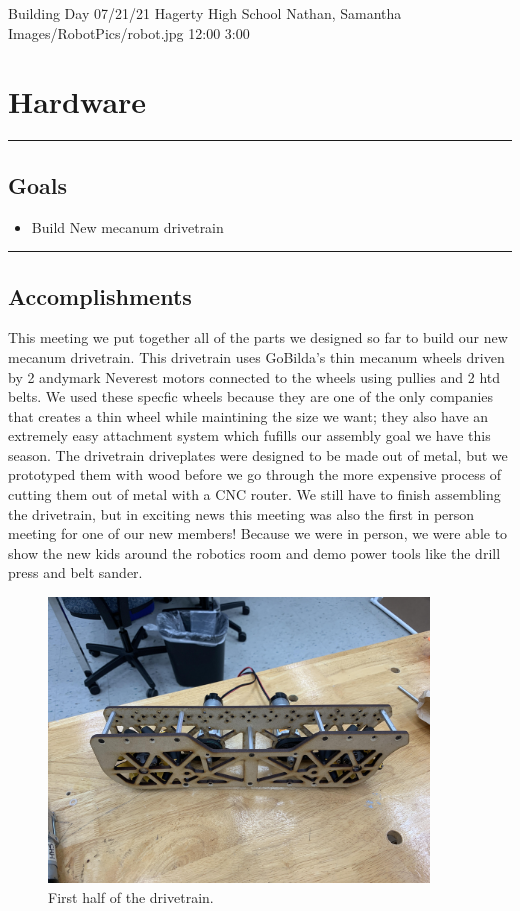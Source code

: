 \insertmeeting 
	{Building Day} 
	{07/21/21}
	{Hagerty High School}
	{Nathan, Samantha}
	{Images/RobotPics/robot.jpg}
	{12:00}
  {3:00}
	
\section*{Hardware}
\noindent\hfil\rule{\textwidth}{.4pt}\hfil
\subsection*{Goals}
\begin{itemize}
    \item Build New mecanum drivetrain   

\end{itemize} 

\noindent\hfil\rule{\textwidth}{.4pt}\hfil

\subsection*{Accomplishments}
This meeting we put together all of the parts we designed so far to build our new mecanum drivetrain. This drivetrain uses GoBilda's thin mecanum wheels driven by 2 andymark Neverest motors connected to the wheels using pullies and 2 htd belts. We used these specfic wheels because they are one of the only companies that creates a thin wheel while maintining the size we want; they also have an extremely easy attachment system which fufills our assembly goal we have this season. The drivetrain driveplates were designed to be made out of metal, but we prototyped them with wood before we go through the more expensive process of cutting them out of metal with a CNC router. We still have to finish assembling the drivetrain, but in exciting news this meeting was also the first in person meeting for one of our new members! Because we were in person, we were able to show the new kids around the robotics room and demo power tools like the drill press and belt sander.

\begin{figure}[htp]
\centering
\includegraphics[width=0.9\textwidth, angle=0]{Meetings/July/07-21-21/drivetrain_7-20-21-NathanForrer.jpg}
\caption{First half of the drivetrain.}
\label{fig:pic1}
\end{figure}